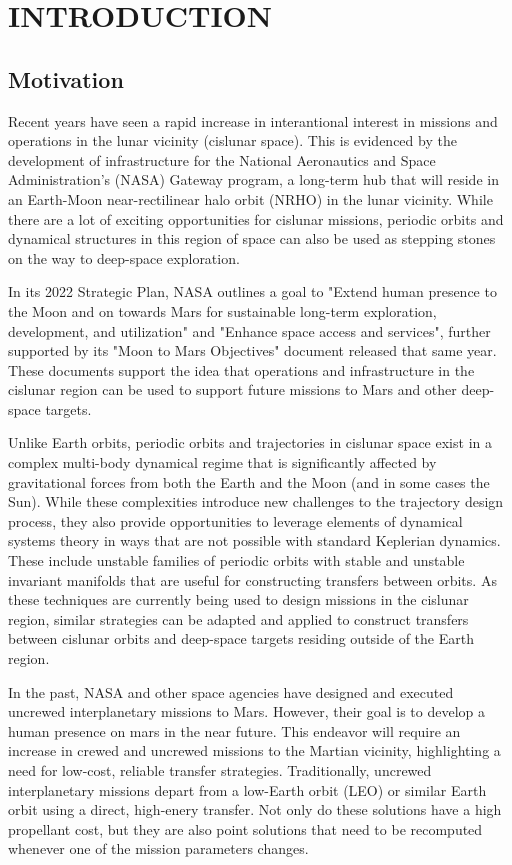\chapter{INTRODUCTION}
\section{Motivation}
Recent years have seen a rapid increase in interantional interest in missions and operations in the
lunar vicinity (cislunar space). This is evidenced by the development of infrastructure for the
National Aeronautics and Space Administration's (NASA) Gateway program, a long-term hub that will
reside in an Earth-Moon near-rectilinear halo orbit (NRHO) in the lunar vicinity\cite{Zamora:2024}.
While there are a lot of exciting opportunities for cislunar missions, periodic orbits and
dynamical structures in this region of space can also be used as stepping stones on the way to
deep-space exploration.

In its 2022 Strategic Plan, NASA outlines a goal to "Extend human presence to the Moon and on
towards Mars for sustainable long-term exploration, development, and utilization" and "Enhance
space access and services"\cite{NASA:2022s}, further supported by its "Moon to Mars
Objectives" document released that same year\cite{NASA:2022m}. These documents support the idea
that operations and infrastructure in the cislunar region can be used to support future missions to
Mars and other deep-space targets.

Unlike Earth orbits, periodic orbits and trajectories in cislunar space exist in a complex
multi-body dynamical regime that is significantly affected by gravitational forces from both the
Earth and the Moon (and in some cases the Sun). While these complexities introduce new challenges
to the trajectory design process, they also provide opportunities to leverage elements of dynamical
systems theory in ways that are not possible with standard Keplerian dynamics. These include
unstable families of periodic orbits with stable and unstable invariant manifolds that are useful
for constructing transfers between orbits. As these techniques are currently being used to design
missions in the cislunar region, similar strategies can be adapted and applied to construct
transfers between cislunar orbits and deep-space targets residing outside of the Earth region.

In the past, NASA and other space agencies have designed and executed uncrewed interplanetary
missions to Mars. However, their goal is to develop a human presence on mars in the near future.
This endeavor will require an increase in crewed and uncrewed missions to the Martian vicinity,
highlighting a need for low-cost, reliable transfer strategies. Traditionally, uncrewed
interplanetary missions depart from a low-Earth orbit (LEO) or similar Earth orbit using a direct,
high-enery transfer\cite{Drake:2009}. Not only do these solutions have a high propellant cost, but
they are also point solutions that need to be recomputed whenever one of the mission parameters
changes.

